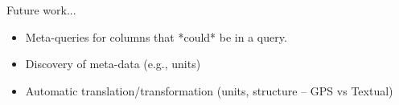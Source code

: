Future work...

\begin{itemize}
  \item Meta-queries for columns that *could* be in a query.
  \item Discovery of meta-data (e.g., units)
  \item Automatic translation/transformation (units, structure -- GPS vs Textual)
\end{itemize}